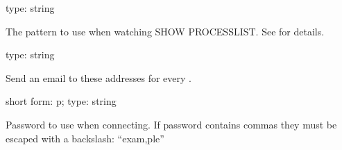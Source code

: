 \documentclass[letterpaper,10pt,english]{sphinxmanual}
\begin{document}
\begin{fulllineitems}
\label{\detokenize{mariadb-stat:cmdoption-mariadb-stat-match}}
\sphinxAtStartPar
type: string

\sphinxAtStartPar
The pattern to use when watching SHOW PROCESSLIST.  See {\hyperref[\detokenize{mariadb-stat:cmdoption-mariadb-stat-function}]{}}
for details.

\end{fulllineitems}


\begin{fulllineitems}
\label{\detokenize{mariadb-stat:cmdoption-mariadb-stat-notify-by-email}}
\sphinxAtStartPar
type: string

\sphinxAtStartPar
Send an email to these addresses for every {\hyperref[\detokenize{mariadb-stat:cmdoption-mariadb-stat-collect}]{}}.

\end{fulllineitems}


\begin{fulllineitems}
\label{\detokenize{mariadb-stat:cmdoption-mariadb-stat-password}}
\sphinxAtStartPar
short form: \sphinxhyphen{}p; type: string

\sphinxAtStartPar
Password to use when connecting.
If password contains commas they must be escaped with a backslash: “exam,ple”

\end{fulllineitems}
\end{document}
